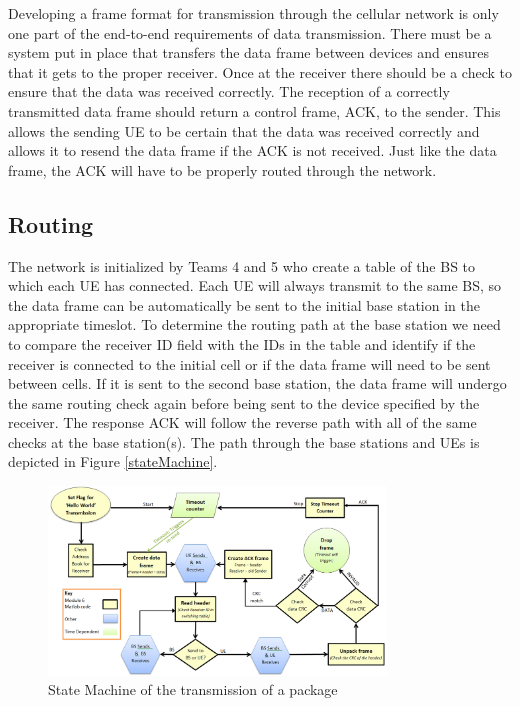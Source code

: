 Developing a frame format for transmission through the cellular network is only one part of the end-to-end requirements of data transmission. There must be a system put in place that transfers the data frame between devices and ensures that it gets to the proper receiver. Once at the receiver there should be a check to ensure that the data was received correctly. The reception of a correctly transmitted data frame should return a control frame, ACK, to the sender.  This allows the sending UE to be certain that the data was received correctly and allows it to resend the data frame if the ACK is not received. Just like the data frame, the ACK will have to be properly routed through the network. 

\subsection {Routing}

The network is initialized by Teams 4 and 5 who create a table of the BS to which each UE has connected. Each UE will always transmit to the same BS, so the data frame can be automatically be sent to the initial base station in the appropriate timeslot.  To determine the routing path at the base station we need to compare the receiver ID field with the IDs in the table and identify if the receiver is connected to the initial cell or if the data frame will need to be sent between cells. If it is sent to the second base station, the data frame will undergo the same routing check again before being sent to the device specified by the receiver. The response ACK will follow the reverse path with all of the same checks at the base station(s). The path through the base stations and UEs is depicted in Figure \ref{stateMachine}.

\begin{figure}[ht]
    \centering
    \includegraphics[width=0.8\textwidth]{State_Machine_yellow.PNG}
    \caption{State Machine of the transmission of a package }
    \label{fig:stateMachine}
\end{figure}

